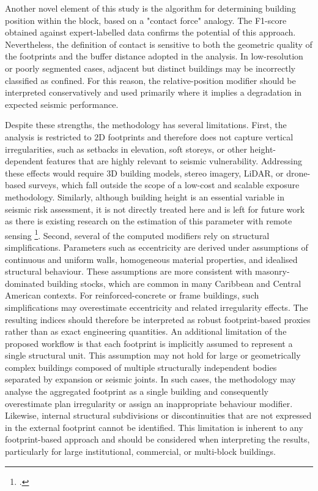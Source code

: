 \begin{refsection}
Another novel element of this study is the algorithm for determining building position within the block, based on a "contact force" analogy. The F1-score obtained against expert-labelled data confirms the potential of this approach. Nevertheless, the definition of contact is sensitive to both the geometric quality of the footprints and the buffer distance adopted in the analysis. In low-resolution or poorly segmented cases, adjacent but distinct buildings may be incorrectly classified as confined. For this reason, the relative-position modifier should be interpreted conservatively and used primarily where it implies a degradation in expected seismic performance.

Despite these strengths, the methodology has several limitations.  First, the analysis is restricted to 2D footprints and therefore does not capture vertical irregularities, such as setbacks in elevation, soft storeys, or other height-dependent features that are highly relevant to seismic vulnerability. Addressing these effects would require 3D building models, stereo imagery, LiDAR, or drone-based surveys, which fall outside the scope of a low-cost and scalable exposure methodology. Similarly, although building height is an essential variable in seismic risk assessment, it is not directly treated here and is left for future work as there is existing research on the estimation of this parameter with remote sensing \footcite{YADAV2025114556, LYU2024114017}. Second, several of the computed modifiers rely on structural simplifications. Parameters such as eccentricity are derived under assumptions of continuous and uniform walls, homogeneous material properties, and idealised structural behaviour. These assumptions are more consistent with masonry-dominated building stocks, which are common in many Caribbean and Central American contexts. For reinforced-concrete or frame buildings, such simplifications may overestimate eccentricity and related irregularity effects. The resulting indices should therefore be interpreted as robust footprint-based proxies rather than as exact engineering quantities. An additional limitation of the proposed workflow is that each footprint is implicitly assumed to represent a single structural unit. This assumption may not hold for large or geometrically complex buildings composed of multiple structurally independent bodies separated by expansion or seismic joints. In such cases, the methodology may analyse the aggregated footprint as a single building and consequently overestimate plan irregularity or assign an inappropriate behaviour modifier. Likewise, internal structural subdivisions or discontinuities that are not expressed in the external footprint cannot be identified. This limitation is inherent to any footprint-based approach and should be considered when interpreting the results, particularly for large institutional, commercial, or multi-block buildings.


\end{refsection}
